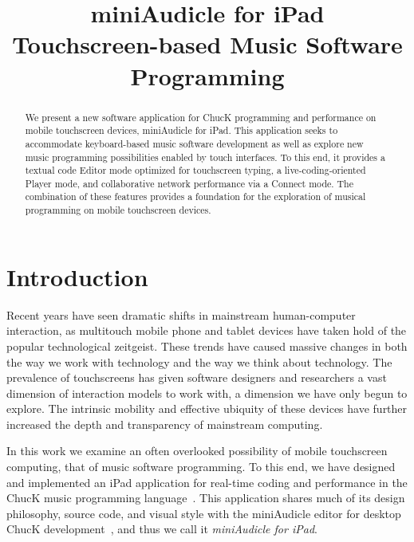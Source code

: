 \documentclass{article}
\title{miniAudicle for iPad \\ Touchscreen-based Music Software Programming}
\begin{document}
%
\capstartfalse
\maketitle
\capstarttrue
%
\begin{abstract}

We present a new software application for ChucK programming and performance on mobile touchscreen devices, miniAudicle for iPad. 
This application seeks to accommodate keyboard-based music software development as well as explore new music programming possibilities enabled by touch interfaces. 
To this end, it provides a textual code Editor mode optimized for touchscreen typing, a live-coding-oriented Player mode, and collaborative network performance via a Connect mode. 
The combination of these features provides a foundation for the exploration of musical programming on mobile touchscreen devices. 

\end{abstract}
%

\section{Introduction}\label{sec:introduction}

Recent years have seen dramatic shifts in mainstream human-computer interaction, as multitouch mobile phone and tablet devices have taken hold of the popular technological zeitgeist. 
These trends have caused massive changes in both the way we work with technology and the way we think about technology. 
The prevalence of touchscreens has given software designers and researchers a vast dimension of interaction models to work with, a dimension we have only begun to explore. 
The intrinsic mobility and effective ubiquity of these devices have further increased the depth and transparency of mainstream computing. 

In this work we examine an often overlooked possibility of mobile touchscreen computing, that of music software programming. 
To this end, we have designed and implemented an iPad application for real-time coding and performance in the ChucK music programming language~\cite{wang2008chuck}. 
This application shares much of its design philosophy, source code, and visual style with the miniAudicle editor for desktop ChucK development~\cite{salazar2006miniaudicle}, and thus we call it \textit{miniAudicle for iPad}. 
\end{document}
